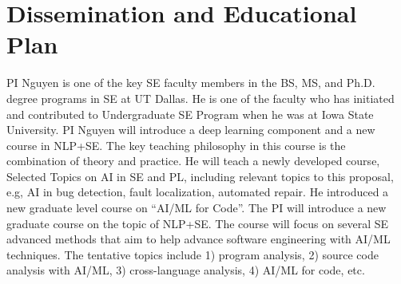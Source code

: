 \section{Dissemination and Educational Plan}
\label{edu}



PI Nguyen is one of the key SE faculty members in the BS, MS, and Ph.D.
degree programs in SE at UT Dallas. 
%
He is one of the faculty who has initiated and contributed to
Undergraduate SE Program when he was at Iowa State University.
PI Nguyen will introduce a deep
learning component and a new course in NLP+SE.
The key teaching philosophy in this course is the combination of theory and practice.
He will teach a newly developed course, 
Selected Topics on AI in SE and PL,
including relevant topics to this proposal, e.g, 
AI in bug detection, fault localization, automated repair. 
He introduced a new graduate level course on ``AI/ML for
Code''. The PI will introduce a new graduate course on the topic of
NLP+SE.
The course will focus on several SE advanced methods that
aim to help advance software engineering with AI/ML techniques. 
The tentative topics include 1) program analysis, 2) source code
analysis with AI/ML, 3) cross-language analysis,
4) AI/ML for code, etc.



